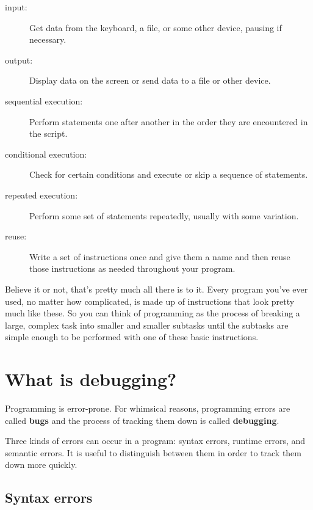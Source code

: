 \documentclass[10pt]{book}
\begin{document}
\begin{description}

\item[input:] Get data from the keyboard, a file, or some
other device, pausing if necessary.

\item[output:] Display data on the screen or send data to a
file or other device.

\item[sequential execution:] Perform statements one after
another in the order they are encountered in the script.

\item[conditional execution:] Check for certain conditions and
execute or skip a sequence of statements.

\item[repeated execution:] Perform some set of statements 
repeatedly, usually with
some variation.

\item[reuse:] Write a set of instructions once and give them a name
and then reuse those instructions as needed throughout your program.

\end{description}

Believe it or not, that's pretty much all there is to it.  Every
program you've ever used, no matter how complicated, is made up of
instructions that look pretty much like these.  So you can think of
programming as the process of breaking a large, complex task
into smaller and smaller subtasks until the subtasks are
simple enough to be performed with one of these basic instructions.

\section{What is debugging?}

Programming is error-prone.  For whimsical reasons, programming errors
are called {\bf bugs} and the process of tracking them down is called
{\bf debugging}.


Three kinds of errors can occur in a program: syntax errors, runtime 
errors, and semantic errors. It is useful
to distinguish between them in order to track them down more quickly.

\subsection{Syntax errors}
\end{document}
